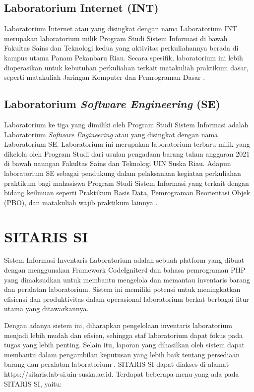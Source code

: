 \subsection{Laboratorium Internet (INT)}
Laboratorium Internet atau yang disingkat dengan nama Laboratorium INT merupakan laboratorium milik Program Studi Sistem Informasi di bawah Fakultas Sains dan Teknologi kedua yang aktivitas perkuliahannya berada di kampus utama Panam Pekanbaru Riau. Secara spesifik, laboratorium ini lebih dioperasikan untuk kebutuhan perkuliahan terkait matakuliah praktikum dasar, seperti matakuliah Jaringan Komputer dan Pemrograman Dasar \cite{lab-si-website}.

\subsection{Laboratorium \textit{Software Engineering} (SE)}
Laboratorium ke tiga yang dimiliki oleh Program Studi Sistem Informasi adalah Laboratorium \textit{Software Engineering} atau yang disingkat dengan nama Laboratorium SE. Laboratorium ini merupakan laboratorium terbaru milik yang dikelola oleh Program Studi dari usulan pengadaan barang tahun anggaran 2021 di bawah naungan Fakultas Sains dan Teknologi UIN Suska Riau. Adapun laboratorium SE sebagai pendukung dalam pelaksanaan kegiatan perkuliahan praktikum bagi mahasiswa Program Studi Sistem Informasi yang terkait dengan bidang keilmuan seperti Praktikum Basis Data, Pemrograman Beorientasi Objek (PBO), dan matakuliah wajib praktikum lainnya \cite{lab-si-website}.

\section{SITARIS SI}

Sistem Informasi Inventaris Laboratorium adalah sebuah platform yang dibuat dengan menggunakan Framework CodeIgniter4 dan bahasa pemrograman PHP yang dimaksudkan untuk membantu mengelola dan memantau inventaris barang dan peralatan laboratorium. Sistem ini memiliki potensi untuk meningkatkan efisiensi dan produktivitas dalam operasional laboratorium berkat berbagai fitur utama yang ditawarkannya.

Dengan adanya sistem ini, diharapkan pengelolaan inventaris laboratorium menjadi lebih mudah dan efisien, sehingga staf laboratorium dapat fokus pada tugas yang lebih penting. Selain itu, laporan yang dihasilkan oleh sistem dapat membantu dalam pengambilan keputusan yang lebih baik tentang persediaan barang dan peralatan laboratorium \cite{sitaris-lab-si-website}. SITARIS SI dapat diakses di alamat https://sitaris.lab-si.uin-suska.ac.id. Terdapat beberapa menu yang ada pada SITARIS SI, yaitu:

